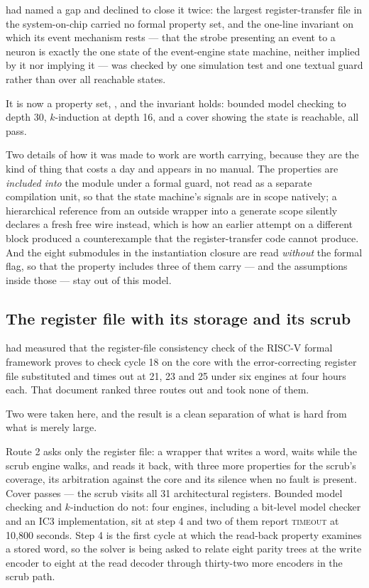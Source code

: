  had named a gap and declined to close it twice:
the largest register-transfer file in the system-on-chip carried no
formal property set, and the one-line invariant on which its event
mechanism rests --- that the strobe presenting an event to a neuron is
exactly the one state of the event-engine state machine, neither
implied by it nor implying it --- was checked by one simulation test
and one textual guard rather than over all reachable states.

It is now a property set, , and the
invariant holds: bounded model checking to depth 30, $k$-induction at
depth 16, and a cover showing the state is reachable, all pass.

Two details of how it was made to work are worth carrying, because they
are the kind of thing that costs a day and appears in no manual. The
properties are \emph{included into} the module under a formal guard, not
read as a separate compilation unit, so that the state machine's
signals are in scope natively; a hierarchical reference from an outside
wrapper into a generate scope silently declares a fresh free wire
instead, which is how an earlier attempt on a different block produced a
counterexample that the register-transfer code cannot produce. And the
eight submodules in the instantiation closure are read \emph{without}
the formal flag, so that the property includes three of them carry ---
and the assumptions inside those --- stay out of this model.

\subsection{The register file with its storage and its scrub}

 had measured that the register-file consistency
check of the RISC-V formal framework proves to check cycle 18 on the
core with the error-correcting register file substituted and times out
at 21, 23 and 25 under six engines at four hours each. That document
ranked three routes out and took none of them.

Two were taken here, and the result is a clean separation of what is
hard from what is merely large.

Route 2 asks only the register file: a wrapper that writes a word,
waits while the scrub engine walks, and reads it back, with three more
properties for the scrub's coverage, its arbitration against the core
and its silence when no fault is present. Cover passes --- the scrub
visits all 31 architectural registers. Bounded model checking and
$k$-induction do not: four engines, including a bit-level model checker
and an IC3 implementation, sit at step 4 and two of them report
\textsc{timeout} at 10{,}800 seconds. Step 4 is the first cycle at which
the read-back property examines a stored word, so the solver is being
asked to relate eight parity trees at the write encoder to eight at the
read decoder through thirty-two more encoders in the scrub path.

